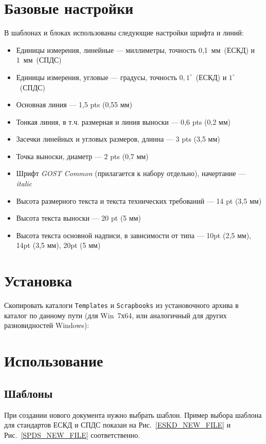 \documentclass[oneside,final,14pt]{extreport}
\begin{document}
\section{\Large Базовые настройки}
В шаблонах и блоках использованы следующие настройки шрифта и линий:
\begin{itemize}
\item Единицы измерения, линейные --- миллиметры, точность 0,1~мм~(ЕСКД) и 1~мм~(СПДС)
\item Единицы измерения, угловые --- градусы, точность $0,1^\circ$~(ЕСКД) и $1^\circ$~(СПДС)
\item Основная линия --- 1,5 pts (0,55 мм)
\item Тонкая линия, в т.ч. размерная и линия выноски --- 0,6 pts (0,2 мм)
\item Засечки линейных и угловых размеров, длинна --- 3 pts (3,5 мм)
\item Точка выноски, диаметр --- 2 pts (0,7 мм)
\item Шрифт \textit{GOST Common} (прилагается к набору отдельно), начертание --- \textit{italic}
\item Высота размерного текста и текста технических требований --- 14 pt (3,5 мм)
\item Высота текста выноски --- 20 pt (5 мм)
\item Высота текста основной надписи, в зависимости от типа --- 10pt (2,5 мм), 14pt (3,5 мм), 20pt (5 мм)
\end{itemize}

\section{\Large Установка}
Скопировать каталоги \texttt{Templates} и \texttt{Scrapbooks} из установочного архива в каталог по данному пути (для Win~7х64, или аналогичный для других разновидностей Windows):\\

\noindent
{}

\section{\Large Использование}
\subsection{Шаблоны}
При создании нового документа нужно выбрать шаблон. Пример выбора шаблона для стандартов ЕСКД и СПДС показан на Рис.~\ref{ESKD_NEW_FILE} и Рис.~\ref{SPDS_NEW_FILE} соответственно.
\end{document}
